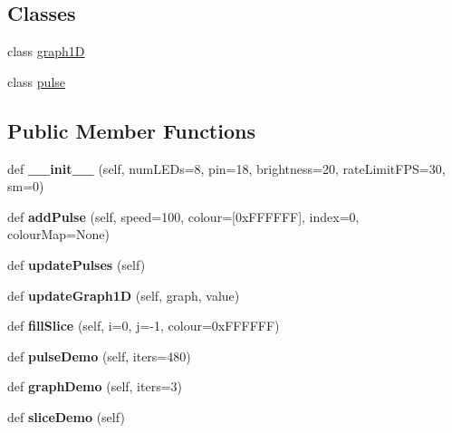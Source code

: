 \subsection*{Classes}
\begin{DoxyCompactItemize}
\item 
class \hyperlink{classglowbit_1_1stick_1_1graph1D}{graph1D}
\item 
class \hyperlink{classglowbit_1_1stick_1_1pulse}{pulse}
\end{DoxyCompactItemize}
\subsection*{Public Member Functions}
\begin{DoxyCompactItemize}
\item 
\mbox{\label{classglowbit_1_1stick_ac51b02c334481110558ac2f8c54938b8}} 
def {\bfseries \+\_\+\+\_\+init\+\_\+\+\_\+} (self, num\+L\+E\+Ds=8, pin=18, brightness=20, rate\+Limit\+F\+PS=30, sm=0)
\item 
\mbox{\label{classglowbit_1_1stick_a14fb6c41aebc0b87595dde1ee4dd35a3}} 
def {\bfseries add\+Pulse} (self, speed=100, colour=\mbox{[}0x\+F\+F\+F\+F\+F\+F\mbox{]}, index=0, colour\+Map=\+None)
\item 
\mbox{\label{classglowbit_1_1stick_a84e72d81b9c96b1acb268b730866a8ea}} 
def {\bfseries update\+Pulses} (self)
\item 
\mbox{\label{classglowbit_1_1stick_acde1622da63c602b209a608384cb6020}} 
def {\bfseries update\+Graph1D} (self, graph, value)
\item 
\mbox{\label{classglowbit_1_1stick_a232b27f2f0e1c27787e6a584a05fc34c}} 
def {\bfseries fill\+Slice} (self, i=0, j=-\/1, colour=0x\+F\+F\+F\+F\+F\+F)
\item 
\mbox{\label{classglowbit_1_1stick_a06f96847a80f19e075de33b565dcd25d}} 
def {\bfseries pulse\+Demo} (self, iters=480)
\item 
\mbox{\label{classglowbit_1_1stick_a7f45fb8bf324841b710a215b1b2e3a1c}} 
def {\bfseries graph\+Demo} (self, iters=3)
\item 
\mbox{\label{classglowbit_1_1stick_a26eedb25d40d67d1e2ca786a7b8eb8b0}} 
def {\bfseries slice\+Demo} (self)
\end{DoxyCompactItemize}
